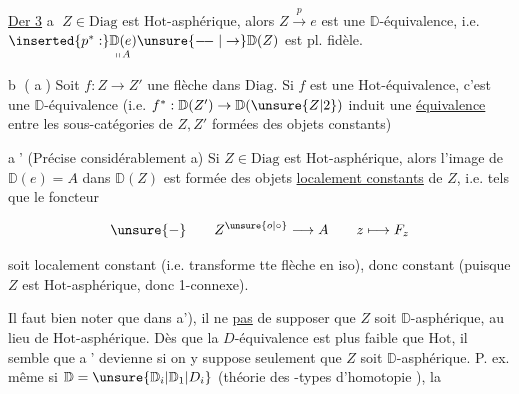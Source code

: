 
\uline{Der 3} \textcircled{\scriptsize a}  $Z\in\mathrm{Diag}$ est $\mathrm{Hot}$-asphérique, alors $Z\xrightarrow{p}e$ est une $\mathbb D$-équivalence, i.e. $\inserted{p^*:}\underset{\shortparallel\, A}{\mathbb D(e)}\unsure{\relbar\joinrel\relbar|\to}\mathbb D(Z)$ est pl. fidèle.

\textcircled{\scriptsize b} ( \textcircled{\scriptsize a}) Soit $f:Z\to Z'$ une flèche dans $\mathrm{Diag}$. Si $f$ est une $\mathrm{Hot}$-équivalence, c'est une $\mathbb D$-équivalence (i.e. $f^*:\mathbb D(Z')\to\mathbb D(\unsure{Z|2})$ induit une \uline{équivalence} entre les sous-catégories de $Z,Z'$ formées des objets constants)

\textcircled{\scriptsize a'} (Précise considérablement a) Si $Z\in\mathrm{Diag}$ est $\mathrm{Hot}$-asphérique, alors  l'image  de $\mathbb D(e)=A$ dans $\mathbb D(Z)$ est formée des objets \uline{localement constants} de $Z$, i.e.  tels que le foncteur

\[
\unsure{\relbar}\qquad Z^{\unsure{o|\circ}}\longrightarrow A\qquad z\longmapsto F_z
\]

soit localement constant (i.e. transforme tte flèche en iso), donc  constant (puisque $Z$ est $\mathrm{Hot}$-asphérique, donc 1-connexe).

Il faut bien noter que dans a'), il ne  \uline{pas} de supposer que $Z$ soit $\mathbb D$-asphérique, au lieu de $\mathrm{Hot}$-asphérique. Dès que la $D$-équivalence est  plus faible que $\mathrm{Hot}$, il semble que \textcircled{\scriptsize a'} devienne    si on y  suppose seulement que $Z$ soit $\mathbb D$-asphérique. P. ex. même si $\mathbb D=\unsure{\mathbb D_i|\mathbb D_1|D_i}$ (théorie des -types d'homotopie ), la  


